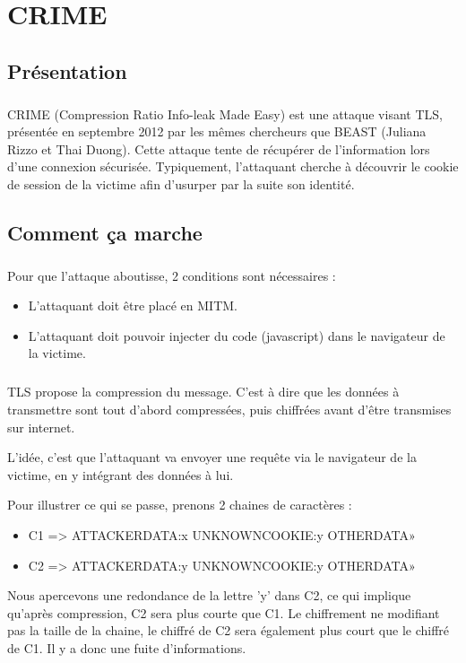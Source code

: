 \chapter{CRIME}
\label{chapter:crime}

\section{Présentation}
\paragraph{}
CRIME (Compression Ratio Info-leak Made Easy) est une attaque visant TLS, présentée en septembre 2012 par les mêmes chercheurs que BEAST (Juliana Rizzo et Thai Duong). Cette attaque tente de récupérer de l'information lors d'une connexion sécurisée. Typiquement, l'attaquant cherche à découvrir le cookie de session de la victime afin d'usurper par la suite son identité.

\section{Comment ça marche}
\paragraph{}
Pour que l'attaque aboutisse, 2 conditions sont nécessaires :
\begin{itemize}
  \item L'attaquant doit être placé en MITM.
  \item L'attaquant doit pouvoir injecter du code (javascript) dans le navigateur de la victime.
\end{itemize}

\paragraph{}
TLS propose la compression du message. C'est à dire que les données à transmettre sont tout d'abord compressées, puis chiffrées avant d'être transmises sur internet.

L'idée, c'est que l'attaquant va envoyer une requête via le navigateur de la victime, en y intégrant des données à lui.

Pour illustrer ce qui se passe, prenons 2 chaines de caractères :
\begin{itemize}
\item C1 => ATTACKERDATA:x UNKNOWNCOOKIE:y OTHERDATA»
\item C2 => ATTACKERDATA:y UNKNOWNCOOKIE:y OTHERDATA»
\end{itemize}
Nous apercevons une redondance de la lettre 'y' dans C2, ce qui implique qu'après compression, C2 sera plus courte que C1. Le chiffrement ne modifiant pas la taille de la chaine, le chiffré de C2 sera également plus court que le chiffré de C1. Il y a donc une fuite d'informations.

